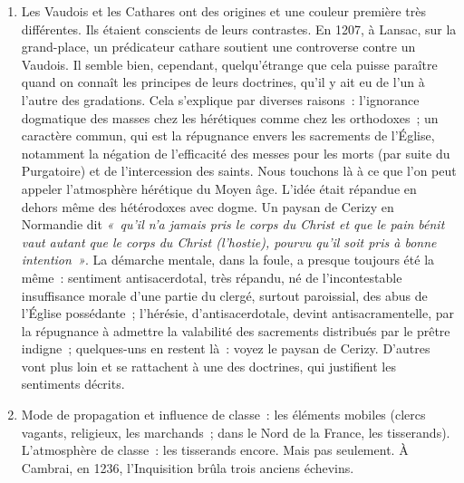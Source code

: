 \documentclass[french,twoside]{book} %
\begin{document}
\begin{enumerate}[itemsep=\baselineskip,]
\item Les Vaudois et les Cathares ont des origines et une couleur première très différentes. Ils étaient conscients de leurs contrastes. En 1207, à Lansac, sur la grand-place, un prédicateur cathare soutient une controverse contre un Vaudois. Il semble bien, cependant, quelqu’étrange que cela puisse paraître quand on connaît les principes de leurs doctrines, qu’il y ait eu de l’un à l’autre des gradations. Cela s’explique par diverses raisons : l’ignorance dogmatique des masses chez les hérétiques comme chez les orthodoxes ; un caractère commun, qui est la répugnance envers les sacrements de l’Église, notamment la négation de l’efficacité des messes pour les morts (par suite du Purgatoire) et de l’intercession des saints. Nous touchons là à ce que l’on peut appeler l’atmosphère hérétique du Moyen âge. L’idée était répandue en dehors même des hétérodoxes avec dogme. Un paysan de Cerizy en Normandie dit \emph{« qu’il n’a jamais pris le corps du Christ et que le pain bénit vaut autant que le corps  
\label{p103} du Christ (l’hostie), pourvu qu’il soit pris à bonne intention »}. La démarche mentale, dans la foule, a presque toujours été la même : sentiment antisacerdotal, très répandu, né de l’incontestable insuffisance morale d’une partie du clergé, surtout paroissial, des abus de l’Église possédante ; l’hérésie, d’antisacerdotale, devint antisacramentelle, par la répugnance à admettre la valabilité des sacrements distribués par le prêtre indigne ; quelques-uns en restent là : voyez le paysan de Cerizy. D’autres vont plus loin et se rattachent à une des doctrines, qui justifient les sentiments décrits.
\item Mode de propagation et influence de classe : les éléments mobiles (clercs vagants, religieux, les marchands ; dans le Nord de la France, les tisserands). L’atmosphère de classe : les tisserands encore. Mais pas seulement. À Cambrai, en 1236, l’Inquisition brûla trois anciens échevins.
\end{enumerate}
\end{document}
